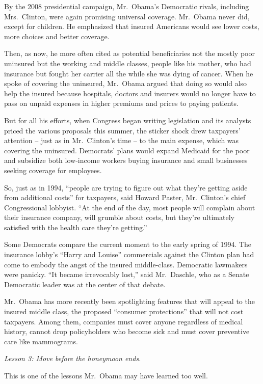 ﻿\documentclass[12pt]{article}
\begin{document}
By the 2008 presidential campaign, Mr.~Obama's Democratic rivals, including Mrs.~Clinton, were again
promising universal coverage. Mr.~Obama never did, except for children. He emphasized that insured
Americans would see lower costs, more choices and better coverage.

Then, as now, he more often cited as potential beneficiaries not the mostly poor uninsured but the
working and middle classes, people like his mother, who had insurance but fought her carrier all the
while she was dying of cancer. When he spoke of covering the uninsured, Mr.~Obama argued that doing
so would also help the insured because hospitals, doctors and insurers would no longer have to pass
on unpaid expenses in higher premiums and prices to paying patients.

But for all his efforts, when Congress began writing legislation and its analysts priced the various
proposals this summer, the sticker shock drew taxpayers' attention -- just as in Mr.~Clinton's time
-- to the main expense, which was covering the uninsured. Democrats' plans would expand Medicaid for
the poor and subsidize both low-income workers buying insurance and small businesses seeking
coverage for employees.

So, just as in 1994, ``people are trying to figure out what they're getting aside from additional
costs'' for taxpayers, said Howard Paster, Mr.~Clinton's chief Congressional lobbyist. ``At the end
of the day, most people will complain about their insurance company, will grumble about costs, but
they're ultimately satisfied with the health care they're getting.''

Some Democrats compare the current moment to the early spring of 1994. The insurance lobby's ``Harry
and Louise'' commercials against the Clinton plan had come to embody the angst of the insured
middle-class. Democratic lawmakers were panicky. ``It became irrevocably lost,'' said Mr.~Daschle,
who as a Senate Democratic leader was at the center of that debate.

Mr.~Obama has more recently been spotlighting features that will appeal to the insured middle class,
the proposed ``consumer protections'' that will not cost taxpayers. Among them, companies must cover
anyone regardless of medical history, cannot drop policyholders who become sick and must cover
preventive care like mammograms.

\emph{Lesson 3: Move before the honeymoon ends.}

This is one of the lessons Mr.~Obama may have learned too well.
\end{document}
